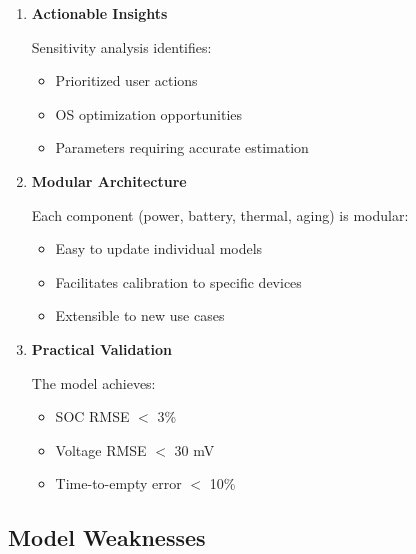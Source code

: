 \begin{enumerate}
    Monte Carlo propagation provides:
    \begin{itemize}
        \item Confidence intervals for predictions
        \item Identification of dominant uncertainty sources
        \item Risk-aware decision making
    \end{itemize}
    
    \item \textbf{Actionable Insights}
    
    Sensitivity analysis identifies:
    \begin{itemize}
        \item Prioritized user actions
        \item OS optimization opportunities
        \item Parameters requiring accurate estimation
    \end{itemize}
    
    \item \textbf{Modular Architecture}
    
    Each component (power, battery, thermal, aging) is modular:
    \begin{itemize}
        \item Easy to update individual models
        \item Facilitates calibration to specific devices
        \item Extensible to new use cases
    \end{itemize}
    
    \item \textbf{Practical Validation}
    
    The model achieves:
    \begin{itemize}
        \item SOC RMSE $<$ 3\%
        \item Voltage RMSE $<$ 30 mV
        \item Time-to-empty error $<$ 10\%
    \end{itemize}
\end{enumerate}

\subsection{Model Weaknesses}
\label{subsec:weaknesses}

